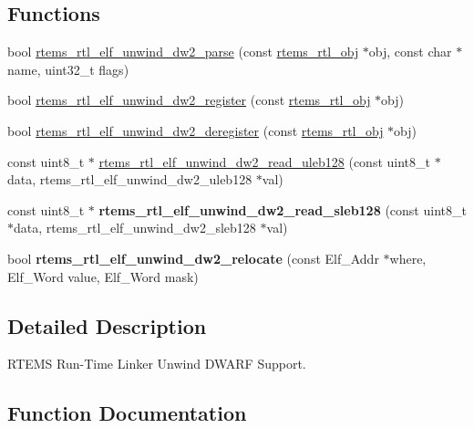 \subsection*{Functions}
\begin{DoxyCompactItemize}
\item 
bool \mbox{\hyperlink{rtl-unwind-dw2_8h_a0c7193498e6ee5edea31888a8a904950}{rtems\+\_\+rtl\+\_\+elf\+\_\+unwind\+\_\+dw2\+\_\+parse}} (const \mbox{\hyperlink{structrtems__rtl__obj}{rtems\+\_\+rtl\+\_\+obj}} $\ast$obj, const char $\ast$name, uint32\+\_\+t flags)
\item 
bool \mbox{\hyperlink{rtl-unwind-dw2_8h_ab36b84a3de9ae023f5e7badf05d9b893}{rtems\+\_\+rtl\+\_\+elf\+\_\+unwind\+\_\+dw2\+\_\+register}} (const \mbox{\hyperlink{structrtems__rtl__obj}{rtems\+\_\+rtl\+\_\+obj}} $\ast$obj)
\item 
bool \mbox{\hyperlink{rtl-unwind-dw2_8h_a1aceba6bf892b99109243a17fb714f7f}{rtems\+\_\+rtl\+\_\+elf\+\_\+unwind\+\_\+dw2\+\_\+deregister}} (const \mbox{\hyperlink{structrtems__rtl__obj}{rtems\+\_\+rtl\+\_\+obj}} $\ast$obj)
\item 
const uint8\+\_\+t $\ast$ \mbox{\hyperlink{rtl-unwind-dw2_8h_aec6324a74aa21550d438fb5786ecf075}{rtems\+\_\+rtl\+\_\+elf\+\_\+unwind\+\_\+dw2\+\_\+read\+\_\+uleb128}} (const uint8\+\_\+t $\ast$data, rtems\+\_\+rtl\+\_\+elf\+\_\+unwind\+\_\+dw2\+\_\+uleb128 $\ast$val)
\item 
\mbox{\label{rtl-unwind-dw2_8h_a731fa1689119498d82dcba44078e687c}} 
const uint8\+\_\+t $\ast$ {\bfseries rtems\+\_\+rtl\+\_\+elf\+\_\+unwind\+\_\+dw2\+\_\+read\+\_\+sleb128} (const uint8\+\_\+t $\ast$data, rtems\+\_\+rtl\+\_\+elf\+\_\+unwind\+\_\+dw2\+\_\+sleb128 $\ast$val)
\item 
\mbox{\label{rtl-unwind-dw2_8h_a66d041425d7af357ce6b47f0d1aaa406}} 
bool {\bfseries rtems\+\_\+rtl\+\_\+elf\+\_\+unwind\+\_\+dw2\+\_\+relocate} (const Elf\+\_\+\+Addr $\ast$where, Elf\+\_\+\+Word value, Elf\+\_\+\+Word mask)
\end{DoxyCompactItemize}


\subsection{Detailed Description}
R\+T\+E\+MS Run-\/\+Time Linker Unwind D\+W\+A\+RF Support. 



\subsection{Function Documentation}
\mbox{\label{rtl-unwind-dw2_8h_a1aceba6bf892b99109243a17fb714f7f}} 

